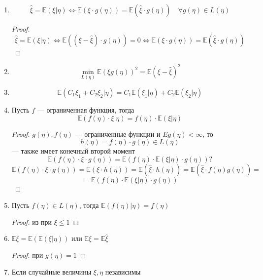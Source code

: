 \begin{prop}
    \begin{enumerate}
        \item \[ \hat{\xi} = \mathbb{E}(\xi | \eta) \Leftrightarrow \mathbb{E}(\xi \cdot g(\eta)) = \mathbb{E}(\hat{\xi}\cdot g(\eta)) \quad \forall g(\eta) \in L(\eta)\]
              \begin{proof}
                  \[ \hat{\xi} = \mathbb{E}(\xi | \eta) \Leftrightarrow \mathbb{E}((\xi - \hat{\xi})\cdot g(\eta)) = 0 \Leftrightarrow \mathbb{E}(\xi \cdot g(\eta)) = \mathbb{E}(\hat{\xi}\cdot g(\eta)) \]
              \end{proof}
        \item \[ \min_{L(\eta)} \mathbb{E}(\xi g(\eta))^2 = \mathbb{E}(\xi - \hat{\xi})^2 \]
        \item \[ \mathbb{E}(C_1\xi_1 + C_2\xi_2 | \eta) = C_1 \mathbb{E}(\xi_1|\eta) + C_2 \mathbb{E}(\xi_2|\eta) \]
        \item Пусть \(f\) --- ограниченная функция, тогда
              \[ \mathbb{E}(f(\eta)\cdot\xi | \eta) = f(\eta)\cdot \mathbb{E}(\xi | \eta) \]
              \begin{proof}
                  \(g(\eta), f(\eta)\) --- ограниченные функции и \(Eg(\eta) < \infty\), то
                  \[h(\eta) = f(\eta)\cdot g(\eta) \in L(\eta)\]
                  --- также имеет конечный второй момент
                  \[ \mathbb{E}(f(\eta)\cdot \xi \cdot g(\eta)) = \mathbb{E}(f(\eta)\cdot \mathbb{E}(\xi | \eta) \cdot g(\eta))? \]
                  \[ \mathbb{E}(f(\eta)\cdot \xi \cdot g(\eta)) = \mathbb{E}(\xi \cdot h(\eta)) = \mathbb{E}(\hat{\xi}\cdot h(\eta)) = \mathbb{E}(\hat{\xi}\cdot f(\eta)g(\eta)) =  \]
                  \[ = \mathbb{E}(f(\eta)\cdot \mathbb{E}(\xi | \eta)\cdot g(\eta)) \]
              \end{proof}
        \item Пусть \(f(\eta) \in L(\eta)\), тогда \(\mathbb{E}(f(\eta) | \eta) = f(\eta)\)
              \begin{proof}
                  из \? при \(\xi \le 1\)
              \end{proof}
        \item \(\mathbb{E}\xi = \mathbb{E}(\mathbb{E}(\xi | \eta))\) или \(\mathbb{E}\xi = \mathbb{E}\hat{\xi}\)
              \begin{proof}
                  при \(g(\eta) = 1\)
              \end{proof}
        \item Если случайные величины \(\xi, \eta\) независимы

\end{enumerate}
\end{prop}
